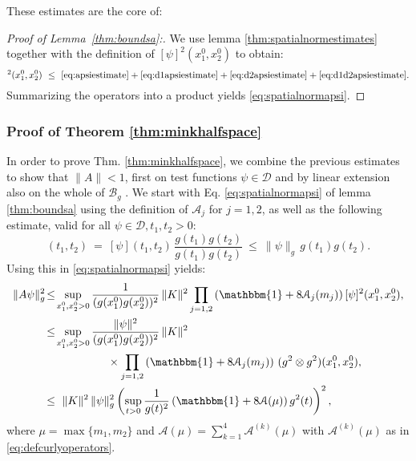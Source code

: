 \documentclass[b5paper,draft,openbib,12pt]{memoir}
\newcommand{\id}{\mathbbm{1}}
\newcommand{\Banach}{\mathscr{B}}
\begin{document}
These estimates are the core of:

\begin{proof}[Proof of Lemma\ \ref{thm:boundsa}:]
	
	We use lemma \ref{thm:spatialnormestimates} together with the definition of $[\psi]^2(x_1^0,x_2^0)$ to obtain:
  \begin{equation}
		[A \psi]^2(x_1^0,x_2^0) ~\leq~ \eqref{eq:apsiestimate} + \eqref{eq:d1apsiestimate}+ \eqref{eq:d2apsiestimate}+ \eqref{eq:d1d2apsiestimate}.
  \end{equation}
	Summarizing the operators into a product yields \eqref{eq:spatialnormapsi}.

\end{proof}

\subsubsection{Proof of Theorem \ref{thm:minkhalfspace}} \label{sec:proofminkhalfspace}

In order to prove Thm. \ref{thm:minkhalfspace}, we combine the 
previous estimates to show that \(\|A\|<1\), first on test 
functions $\psi \in \mathscr{D}$ and by linear extension also on the 
whole of $\Banach_g$ . We start with Eq. \eqref{eq:spatialnormapsi} 
of lemma \ref{thm:boundsa} using the definition of 
\(\mathcal{A}_j\) for \(j=1,2\), as well as the following 
estimate, valid for all \(\psi \in \mathscr{D}, t_1,t_2>0\):
\begin{equation}
	[\psi](t_1,t_2) ~=~ [\psi](t_1,t_2) \, \frac{g(t_1)g(t_2)}{g(t_1)g(t_2)} ~\le~ \|\psi\|_g\, g(t_1)g(t_2).
\end{equation}
Using this in \eqref{eq:spatialnormapsi} yields:
\begin{align}
\|A\psi\|^2_g \!&\le\! \sup_{x_1^0,x_2^0>0}\frac{1}{(g(x_1^0)g(x_2^0))^2} \,  \|K\|^2 \prod_{j=1,2} \left( \id + 8\mathcal{A}_j(m_j) \right) [\psi]^2(x_1^0,x_2^0),\\\nonumber
&\le\! \sup_{x_1^0,x_2^0>0} \frac{\|\psi\|^2}{(g(x_1^0)g(x_2^0))^2} \,  \|K\|^2\\
& \hspace{2cm}\times\prod_{j=1,2} \left( \id + 8\mathcal{A}_j(m_j) \right) \, (g^2\otimes g^2)(x_1^0,x_2^0),\\
&\le~ \|K\|^2\, \|\psi\|^2_g \left( \sup_{t>0}\frac{1}{g(t)^2} \left( \id + 8\mathcal{A}(\mu) \right)g^2 (t) \right)^2,
\label{est:NormA1}
\end{align}
where $\mu = \max \{ m_1,m_2\}$ and 
$\mathcal{A}(\mu) = \sum_{k=1}^4 \mathcal{A}^{(k)}(\mu)$ with 
$ \mathcal{A}^{(k)}(\mu)$ as in \eqref{eq:defcurlyoperators}.
\end{document}

